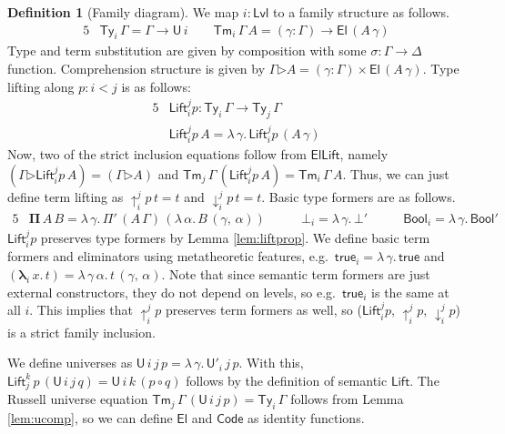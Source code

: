\documentclass[a4paper,UKenglish,cleveref, autoref, thm-restate]{lipics-v2021}
\theoremstyle{remark}
\theoremstyle{definition}
\newtheorem{mydefinition}{Definition}
\newcommand{\Ty}{\mathsf{Ty}}
\newcommand{\Tm}{\mathsf{Tm}}
\newcommand{\U}{\mathsf{U}}
\newcommand{\El}{\mathsf{El}}
\newcommand{\ext}{\triangleright}
\newcommand{\Bool}{\mathsf{Bool}}
\newcommand{\true}{\mathsf{true}}
\newcommand{\up}{\uparrow}
\newcommand{\down}{\downarrow}
\newcommand{\Lift}{\mathsf{Lift}}
\newcommand{\Lvl}{\mathsf{Lvl}}
\renewcommand{\U}{\mathsf{U}}
\newcommand{\Code}{\mathsf{Code}}
\newcommand{\msf}[1]{\mathsf{#1}}
\begin{document}
\begin{mydefinition}[Family diagram]
We map $i : \Lvl$ to a family structure as follows.
\begin{alignat*}{5}
  &\bm{\Ty}_i\,\Gamma = \Gamma \to \U\,i \hspace{2em} \bm{\Tm}_i\,\Gamma\,A = (\gamma : \Gamma) \to \El\,(A\,\gamma)
\end{alignat*}
Type and term substitution are given by composition with some $\sigma : \Gamma
\to \Delta$ function. Comprehension structure is given by $\Gamma \bm{\ext} A =
(\gamma : \Gamma) \times \El\,(A\,\gamma)$. Type lifting along $p : i < j$ is
as follows:
\begin{alignat*}{5}
  & \bm{\Lift}_{i}^{j}p : \bm{\Ty}_i\,\Gamma \to \bm{\Ty}_j\,\Gamma\\
  & \bm{\Lift}_{i}^{j}p\,A = \lambda\,\gamma.\,\Lift_{i}^{j}p\,(A\,\gamma)
\end{alignat*}
Now, two of the strict inclusion equations follow from $\msf{ElLift}$, namely
$(\Gamma \bm{\ext} \bm{\Lift}_{i}^{j}p\,A) = (\Gamma \bm{\ext} A)$ and
$\bm{\Tm}_j\,\Gamma\,(\bm{\Lift}_{i}^{j}p\,A) = \bm{\Tm}_i\,\Gamma\,A$. Thus, we
can just define term lifting as $\bm{\up}_{i}^{j}\!p\,t = t$ and
$\bm{\down}_{i}^{j}\!p\,t = t$. Basic type formers are as follows.
\begin{alignat*}{5}
  & \bm{\Pi}\,A\,B = \lambda\,\gamma.\,\Pi'\,(A\,\Gamma)\,(\lambda\,\alpha.\,B\,(\gamma,\,\alpha))
  & \hspace{2em}\bm{\bot}_i = \lambda\,\gamma.\,\bot'
  & \hspace{2em}\bm{\Bool}_i = \lambda\,\gamma.\,\Bool'
\end{alignat*}
$\bm{\Lift}_{i}^{j}p$ preserves type formers by Lemma \ref{lem:liftprop}. We
define basic term formers and eliminators using metatheoretic features, e.g.\ $\bm{\true}_i
= \lambda\,\gamma.\,\true$ and $(\bm{\lambda}_i\,x.\,t) =
\lambda\,\gamma\,\alpha.\,t\,(\gamma,\,\alpha)$. Note that since semantic term
formers are just external constructors, they do not depend on levels, so
e.g.\ $\bm{\true}_i$ is the same at all $i$. This implies that
$\bm{\up}_{i}^{j}\!p$ preserves term formers as well, so ($\bm{\Lift}_{i}^{j}p$,
$\bm{\up}_{i}^{j}\!p$, $\bm{\down}_{i}^{j}\!p$) is a strict family inclusion.

We define universes as $\bm{\U}\,i\,j\,p = \lambda\,\gamma.\,\U'_i\,j\,p$.  With
this, $\bm{\Lift}_{j}^{k}\,p\,(\bm{\U}\,i\,j\,q) = \bm{\U}\,i\,k\,(p \circ q)$
follows by the definition of semantic $\Lift$. The Russell universe equation
$\bm{\Tm}_j\,\Gamma\,(\bm{\U}\,i\,j\,p) = \bm{\Ty}_i\,\Gamma$ follows from Lemma
\ref{lem:ucomp}, so we can define $\bm{\El}$ and $\bm{\Code}$ as identity functions.

\end{mydefinition}
\end{document}
